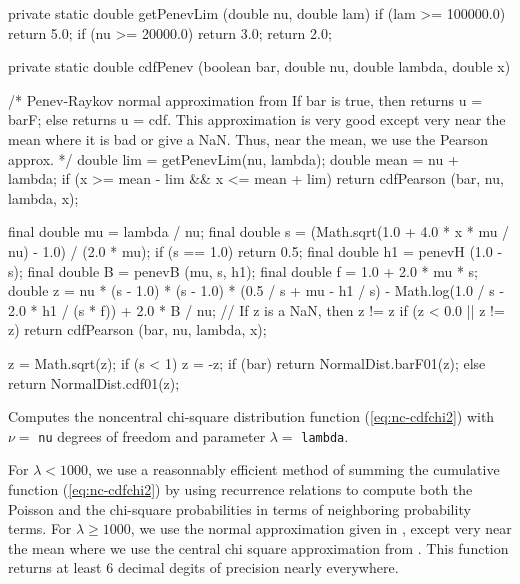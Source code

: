 \begin{code}
\begin{hide}
   private static double getPenevLim (double nu, double lam) {
      if (lam >= 100000.0)
         return 5.0;
      if (nu >= 20000.0)
         return 3.0;
      return 2.0;
   }

   private static double cdfPenev (boolean bar, double nu, double lambda,
                                   double x) {
      /* Penev-Raykov normal approximation from \cite{tPEN00a}
         If bar is true, then returns u = barF; else returns u = cdf.
         This approximation is very good except very near the mean where it
         is bad or give a NaN. Thus, near the mean, we use the Pearson approx.
      */
      double lim = getPenevLim(nu, lambda);
      double mean = nu + lambda;
      if (x >= mean - lim && x <= mean + lim)
         return cdfPearson (bar, nu, lambda, x);

      final double mu = lambda / nu;
      final double s = (Math.sqrt(1.0 + 4.0 * x * mu / nu) - 1.0) / (2.0 * mu);
      if (s == 1.0)
         return 0.5;
      final double h1 = penevH (1.0 - s);
      final double B = penevB (mu, s, h1);
      final double f = 1.0 + 2.0 * mu * s;
      double z = nu * (s - 1.0) * (s - 1.0) * (0.5 / s + mu - h1 / s) -
                 Math.log(1.0 / s - 2.0 * h1 / (s * f)) + 2.0 * B / nu;
      // If z is a NaN, then z != z
      if (z < 0.0 || z != z)
          return cdfPearson (bar, nu, lambda, x);

      z = Math.sqrt(z);
      if (s < 1)
         z = -z;
      if (bar)
         return NormalDist.barF01(z);
      else
         return NormalDist.cdf01(z);
   }
\end{hide}
\end{code}
\begin{tabb}
  Computes the noncentral chi-square distribution function (\ref{eq:nc-cdfchi2})
 with $\nu = $ \texttt{nu} degrees of freedom and parameter $\lambda = $
 \texttt{lambda}.
\begin{detailed} For $\lambda < 1000$, we use a reasonnably
 efficient method
 of summing the cumulative function (\ref{eq:nc-cdfchi2}) by using recurrence
 relations to compute both the Poisson and the chi-square probabilities in terms
 of neighboring probability terms. For $\lambda \ge 1000$, we use the
 normal approximation given in \cite{tPEN00a}, except very near the mean where
 we use the central chi square approximation from \cite{tPEA59a}. This function
 returns at least 6 decimal degits of precision nearly everywhere.
\end{detailed}
\end{tabb}
